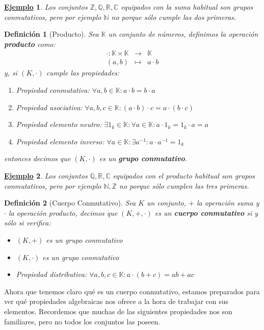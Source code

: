 \documentclass[10pt,a4paper,openright]{book}
\theoremstyle{break}
\newtheorem{defi}{Definición}[chapter]
\newtheorem{ej}{\underline{Ejemplo}}[chapter]
\begin{document}
\begin{ej}
Los conjuntos $\mathbb {Z, Q, R, C}$ equipados con la suma habitual son grupos conmutativos, pero por ejemplo $\mathbb N$ no porque sólo cumple las dos primeras.
\end{ej}

\begin{defi}[Producto]
Sea $\mathbb K$ un conjunto de números, definimos la operación \textbf{producto} como:
\begin{eqnarray*}
\cdot: \mathbb K \times\mathbb K & \longrightarrow & \mathbb K \\
(a,b) & \longmapsto  & a\cdot b
\end{eqnarray*}
y, si $(K, \cdot)$ cumple las propiedades:
\begin{enumerate}
\item Propiedad conmutativa: $\forall a, b \in \mathbb K: a\cdot b=b\cdot a$
\item Propiedad asociativa: $\forall a, b, c\in \mathbb K : (a\cdot b)\cdot c=a\cdot (b\cdot c)$
\item Propiedad elemento neutro: $\exists 1_k\in \mathbb K : \forall a \in \mathbb K : a\cdot 1_k=1_k\cdot a=a$
\item Propiedad elemento inverso: $\forall a \in \mathbb K : \exists a^{-1} : a\cdot a^{-1}=1_k$
\end{enumerate}
entonces decimos que $(K,\cdot)$ es un \textbf{grupo conmutativo}.
\end{defi}

\begin{ej}
Los conjuntos $\mathbb {Q, R, C}$ equipados con el producto habitual son grupos conmutativos, pero por ejemplo $\mathbb {N,Z}$ no porque sólo cumplen las tres primeras.
\end{ej}

\begin{defi}[Cuerpo Conmutativo]
Sea $K$ un conjunto, $+$ la operación suma y $\cdot$ la operación producto, decimos que $(K,+,\cdot)$ es un \textbf{cuerpo conmutativo} si y sólo si verifica:
\begin{itemize}
\item $(K, +)$ es un grupo conmutativo
\item $(K, \cdot)$ es un grupo conmutativo
\item Propiedad distributiva: $\forall a,b,c\in \mathbb K: a\cdot (b+c)=ab+ac$
\end{itemize}
\end{defi}

Ahora que tenemos claro qué es un cuerpo conmutativo, estamos preparados para ver qué propiedades algebraicas nos ofrece a la hora de trabajar con sus elementos. Recordemos que muchas de las siguientes propiedades nos son familiares, pero no todos los conjuntos las poseen.
\end{document}
